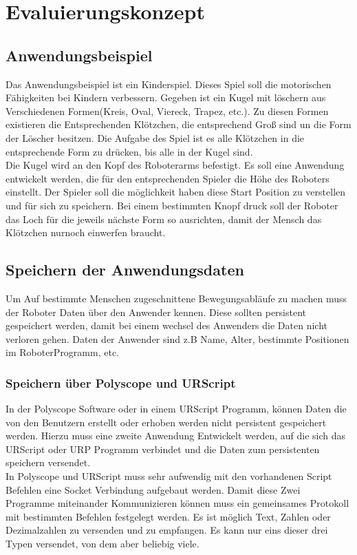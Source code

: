 \chapter{Evaluierungskonzept}
\label{konzept_kon}

\section{Anwendungsbeispiel}
\label{sec:anwendung_kon}

Das Anwendungsbeispiel ist ein Kinderspiel. Dieses Spiel soll die motorischen Fähigkeiten bei Kindern verbessern.
Gegeben ist ein Kugel mit löschern aus Verschiedenen Formen(Kreis, Oval, Viereck, Trapez, etc.). Zu diesen Formen existieren die Entsprechenden Klötzchen, die entsprechend Groß sind un die Form der Löscher besitzen. Die Aufgabe des Spiel ist es alle Klötzchen in die entsprechende Form zu drücken, bis alle in der Kugel sind.
\\
Die Kugel wird an den Kopf des Roboterarms befestigt. Es soll eine Anwendung entwickelt werden, die für den entsprechenden Spieler die Höhe des Roboters einstellt. Der Spieler soll die möglichkeit haben diese Start Position zu verstellen und für sich zu speichern. Bei einem bestimmten Knopf druck soll der Roboter das Loch für die jeweils nächste Form so ausrichten, damit der Mensch das Klötzchen nurnoch einwerfen braucht.

\section{Speichern der Anwendungsdaten}
\label{sec:save_of_data_kon}

Um Auf bestimmte Menschen zugeschnittene Bewegungsabläufe zu machen muss der Roboter Daten über den Anwender kennen. Diese sollten persistent gespeichert werden, damit bei einem wechsel des Anwenders die Daten nicht verloren gehen.
Daten der Anwender sind z.B Name, Alter, bestimmte Positionen im RoboterProgramm, etc.

\subsection{Speichern über Polyscope und URScript}
\label{sec:save_data_polyscope_kon}

In der Polyscope Software oder in einem URScript Programm, können Daten die von den Benutzern erstellt oder erhoben werden nicht persistent
gespeichert werden. Hierzu muss eine zweite Anwendung Entwickelt werden, auf die sich das URScript oder URP Programm verbindet und die Daten zum persistenten speichern versendet.
\\
In Polyscope und URScript muss sehr aufwendig mit den vorhandenen Script Befehlen eine Socket Verbindung aufgebaut werden.
Damit diese Zwei Programme miteinander Kommunizieren können muss ein gemeinsames Protokoll mit bestimmten Befehlen festgelegt werden. Es ist möglich Text, Zahlen oder Dezimalzahlen zu versenden und zu empfangen. Es kann nur eins dieser drei Typen versendet, von dem aber beliebig viele. 

